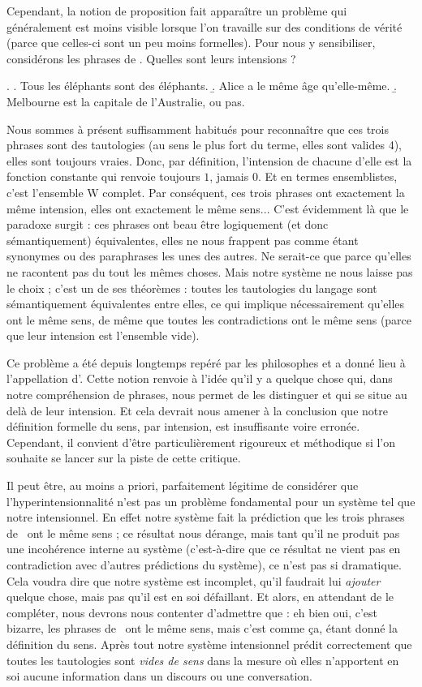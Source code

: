Cependant, la notion de proposition fait apparaître un problème qui généralement est moins visible lorsque l'on travaille sur des conditions de vérité (parce que celles-ci sont un peu moins formelles). 
Pour nous y sensibiliser, considérons les phrases de \Next.
Quelles sont leurs intensions ?

\ex.
\a. Tous les éléphants sont des éléphants.
\b. Alice a le même âge qu'elle-même.
\b. Melbourne est la capitale de l'Australie, ou pas.


Nous sommes à présent suffisamment habitués pour reconnaître que ces trois phrases sont des tautologies (au sens le plus fort du terme, elles sont valides 4), elles sont toujours vraies. 
Donc, par définition, l'intension de chacune d'elle est la fonction constante qui renvoie toujours $1$, jamais $0$. Et en termes ensemblistes, c'est l'ensemble \Unv W complet. Par conséquent, ces trois phrases ont exactement la même intension, elles ont exactement le même sens...
C'est évidemment là que le paradoxe surgit : ces phrases ont beau être logiquement (et donc sémantiquement) équivalentes, elles ne nous frappent pas comme étant synonymes ou des paraphrases les unes des autres. Ne serait-ce que parce qu'elles ne racontent pas du tout les mêmes choses.
Mais notre système ne nous laisse pas le choix ; c'est un de ses théorèmes : toutes les tautologies du langage sont sémantiquement équivalentes entre elles, ce qui implique nécessairement qu'elles ont le même sens, de même que toutes les contradictions ont le même sens (parce que leur intension est l'ensemble vide).

Ce problème a été depuis longtemps repéré par les philosophes et a donné lieu à l'appellation d'.  Cette notion renvoie à l'idée qu'il y a quelque chose qui, dans notre compréhension de phrases, nous permet de les distinguer et qui se situe au delà de leur intension. 
Et cela devrait nous amener à la conclusion que notre définition formelle du sens, par intension, est insuffisante voire erronée.  Cependant, il convient d'être particulièrement rigoureux et méthodique si l'on souhaite se lancer sur la piste de cette critique.

Il peut être, au moins {a priori}, parfaitement légitime de considérer que l'hyperintensionnalité n'est pas un problème fondamental pour un système tel que notre {\LO} intensionnel.  
En effet notre système fait la prédiction que les trois phrases de \Last\ ont le même sens ; ce résultat nous dérange, mais tant qu'il ne produit pas une incohérence interne au système (c'est-à-dire que ce résultat ne vient pas en contradiction avec d'autres prédictions du système), ce n'est pas si dramatique. 
Cela voudra dire que notre système est incomplet, qu'il faudrait lui \emph{ajouter} quelque chose, mais pas qu'il est en soi défaillant.  Et alors, en attendant de le compléter, nous devrons nous contenter d'admettre que : eh bien oui, c'est bizarre, les phrases de \Last\ ont le même sens, mais c'est comme ça, étant donné la définition du sens.  
Après tout notre système intensionnel prédit correctement que toutes les tautologies sont \emph{vides de sens} dans la mesure où elles n'apportent en soi aucune information dans un discours ou une conversation.

